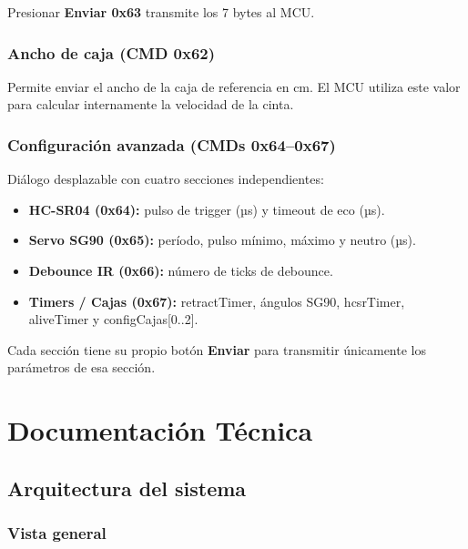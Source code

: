 \documentclass[12pt,a4paper]{report}
\begin{document}
Presionar \textbf{Enviar 0x63} transmite los 7 bytes al MCU.

\section{Ancho de caja (CMD 0x62)}

Permite enviar el ancho de la caja de referencia en cm.  El MCU utiliza
este valor para calcular internamente la velocidad de la cinta.

\section{Configuración avanzada (CMDs 0x64–0x67)}

Diálogo desplazable con cuatro secciones independientes:

\begin{itemize}
  \item \textbf{HC-SR04 (0x64):} pulso de trigger (µs) y timeout de eco (µs).
  \item \textbf{Servo SG90 (0x65):} período, pulso mínimo, máximo y neutro (µs).
  \item \textbf{Debounce IR (0x66):} número de ticks de debounce.
  \item \textbf{Timers / Cajas (0x67):} retractTimer, ángulos SG90, hcsrTimer,
        aliveTimer y configCajas[0..2].
\end{itemize}

Cada sección tiene su propio botón \textbf{Enviar} para transmitir
únicamente los parámetros de esa sección.

\part{Documentación Técnica}

\chapter{Arquitectura del sistema}

\section{Vista general}
\end{document}
